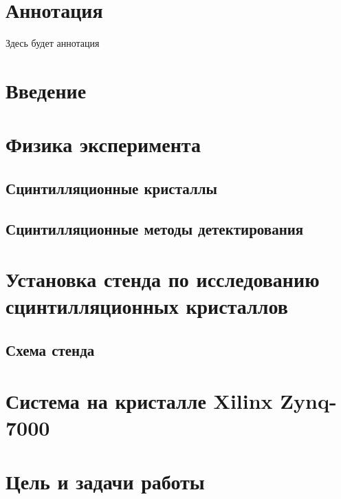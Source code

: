 \documentclass[a4paper, 14pt]{extarticle}
\begin{document}

\section*{Аннотация}
Здесь будет аннотация
\newpage

\tableofcontents
\newpage

\section*{Введение}
    
    \newpage

\section{Физика эксперимента}
    
    \subsection{Сцинтилляционные кристаллы}
    
    \subsection{Сцинтилляционные методы детектирования}
    
    \newpage

\section{Установка стенда по исследованию сцинтилляционных кристаллов}
    
    \subsection{Схема стенда}
    
    \newpage

\section{Система на кристалле Xilinx Zynq-7000}
    
    \newpage
    
\section{Цель и задачи работы}
    
    \newpage
    
\end{document}

